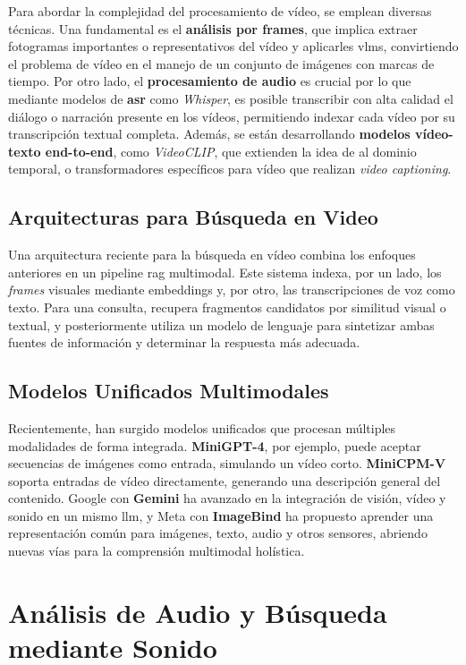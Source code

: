 Para abordar la complejidad del procesamiento de vídeo, se emplean diversas técnicas. Una fundamental es el \textbf{análisis por frames}, que implica extraer fotogramas importantes o representativos del vídeo y aplicarles \glspl{vlm}, convirtiendo el problema de vídeo en el manejo de un conjunto de imágenes con marcas de tiempo. Por otro lado, el \textbf{procesamiento de audio} es crucial por lo que mediante modelos de \textbf{\gls{asr}} como \emph{Whisper}, es posible transcribir con alta calidad el diálogo o narración presente en los vídeos, permitiendo indexar cada vídeo por su transcripción textual completa. Además, se están desarrollando \textbf{modelos vídeo-texto end-to-end}, como \emph{VideoCLIP}, que extienden la idea de  al dominio temporal, o transformadores específicos para vídeo que realizan \emph{video captioning}.

\subsection{Arquitecturas para Búsqueda en Video}

Una arquitectura reciente para la búsqueda en vídeo combina los enfoques anteriores en un pipeline \gls{rag} multimodal. Este sistema indexa, por un lado, los \emph{frames} visuales mediante embeddings y, por otro, las transcripciones de voz como texto. Para una consulta, recupera fragmentos candidatos por similitud visual o textual, y posteriormente utiliza un modelo de lenguaje para sintetizar ambas fuentes de información y determinar la respuesta más adecuada.

\subsection{Modelos Unificados Multimodales}

Recientemente, han surgido modelos unificados que procesan múltiples modalidades de forma integrada. \textbf{MiniGPT-4}, por ejemplo, puede aceptar secuencias de imágenes como entrada, simulando un vídeo corto. \textbf{MiniCPM-V} soporta entradas de vídeo directamente, generando una descripción general del contenido. Google con \textbf{Gemini} ha avanzado en la integración de visión, vídeo y sonido en un mismo \gls{llm}, y Meta con \textbf{ImageBind} ha propuesto aprender una representación común para imágenes, texto, audio y otros sensores, abriendo nuevas vías para la comprensión multimodal holística.

\section{Análisis de Audio y Búsqueda mediante Sonido}


